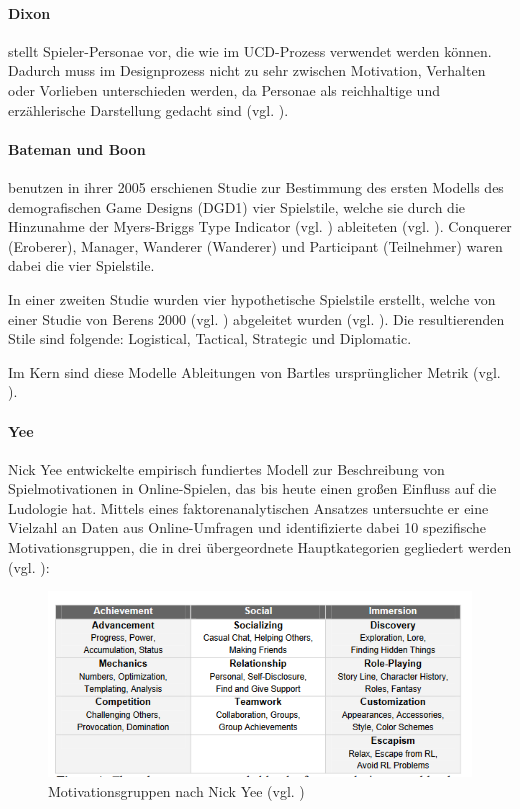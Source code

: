 \paragraph{Dixon} 
stellt Spieler-Personae vor, die wie im \ac{UCD}-Prozess verwendet werden können. Dadurch muss im Designprozess nicht zu sehr zwischen Motivation, Verhalten oder Vorlieben unterschieden werden, da Personae als reichhaltige und erzählerische Darstellung gedacht sind (vgl. \cite{dixon_player_nodate}).

\paragraph{Bateman und Boon}
benutzen in ihrer 2005 erschienen Studie zur Bestimmung des ersten Modells des demografischen Game Designs (DGD1) vier Spielstile, welche sie durch die Hinzunahme der Myers-Briggs Type Indicator (vgl. \cite{noauthor_mbti_nodate}) ableiteten (vgl. \cite{bateman_21st_2005}).
Conquerer (Eroberer), Manager, Wanderer (Wanderer) und Participant (Teilnehmer) waren dabei die vier Spielstile.

In einer zweiten Studie wurden vier hypothetische Spielstile erstellt, welche von einer Studie von Berens 2000 (vgl. \cite{berens_understanding_2000}) abgeleitet wurden (vgl. \cite{bateman_player_2012}). Die resultierenden Stile sind folgende: Logistical, Tactical, Strategic und Diplomatic.

Im Kern sind diese Modelle Ableitungen von Bartles ursprünglicher Metrik (vgl. \cite{ludologie_spielertypen_nodate}).

\paragraph{Yee}
Nick Yee entwickelte empirisch fundiertes Modell zur Beschreibung von Spielmotivationen in Online-Spielen, das bis heute einen großen Einfluss auf die Ludologie hat. Mittels eines faktorenanalytischen Ansatzes untersuchte er eine Vielzahl an Daten aus Online-Umfragen und identifizierte dabei 10 spezifische Motivationsgruppen, die in drei übergeordnete Hauptkategorien gegliedert werden (vgl. \cite{yee_motivations_nodate}):

\begin{figure}[ht]
\centering
\includegraphics[width=1\linewidth]{content/pictures/nick_yee_categorizations.PNG}
\caption{Motivationsgruppen nach Nick Yee (vgl. \cite{yee_motivations_nodate})}
\label{fig:nick_yee_motivations}
\end{figure}

